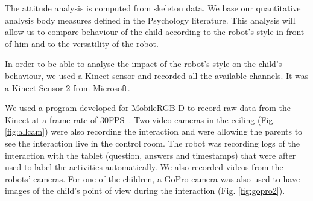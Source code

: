 \documentclass[a4paper,twocolumn]{svjour3}
\begin{document}
The attitude analysis is computed from skeleton data.
We base our quantitative analysis body measures defined in the Psychology literature.
This analysis will allow us to compare behaviour of the child according to the robot's style in front of him and to the versatility of the robot.


In order to be able to analyse the impact of the robot's style on the child's behaviour, we used a Kinect sensor and recorded all the available channels. 
It was a Kinect Sensor 2 from Microsoft. 

We used a program developed for MobileRGB-D to record raw data from the Kinect at a frame rate of 30FPS~\cite{MobileRGB}. 
Two video cameras in the ceiling (Fig. \ref{fig:allcam})  were also recording the interaction and were allowing the parents to see the interaction live in the control room. 
The robot was recording logs of the interaction with the tablet (question, answers and timestamps) that were after used to label the activities  automatically.  
We also recorded videos from the robots' cameras. 
For one of the children, a GoPro camera was also used to have images of the child's point of view during the interaction (Fig. \ref{fig:gopro2}).
\end{document}
